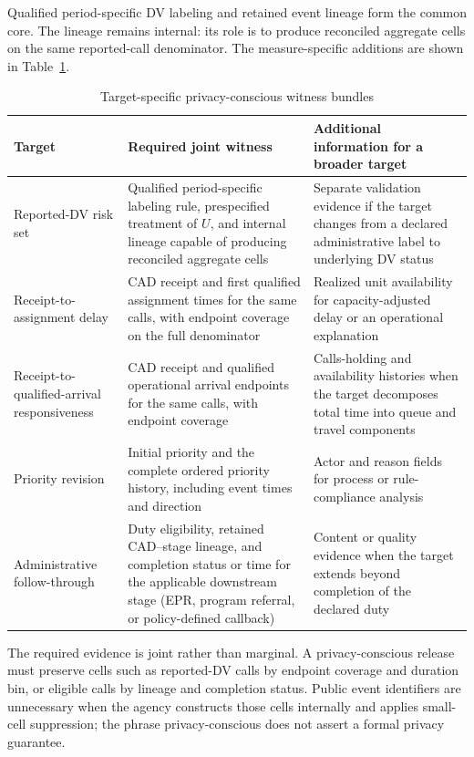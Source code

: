 \documentclass[11pt]{article}
\begin{document}
Qualified period-specific DV labeling and retained event lineage form the common core. The lineage remains internal: its role is to produce reconciled aggregate cells on the same reported-call denominator. The measure-specific additions are shown in Table~\ref{tab:witness_bundles}.

\begin{table}[H]
\centering
\caption{Target-specific privacy-conscious witness bundles}
\label{tab:witness_bundles}
\begin{tabularx}{\textwidth}{@{}>{\raggedright\arraybackslash}p{2.75cm} X X@{}}
\toprule
Target & Required joint witness & Additional information for a broader target \\
\midrule
Reported-DV risk set &
Qualified period-specific labeling rule, prespecified treatment of $U$, and internal lineage capable of producing reconciled aggregate cells &
Separate validation evidence if the target changes from a declared administrative label to underlying DV status \\
\addlinespace
Receipt-to-assignment delay &
CAD receipt and first qualified assignment times for the same calls, with endpoint coverage on the full denominator &
Realized unit availability for capacity-adjusted delay or an operational explanation \\
\addlinespace
Receipt-to-qualified-arrival responsiveness &
CAD receipt and qualified operational arrival endpoints for the same calls, with endpoint coverage &
Calls-holding and availability histories when the target decomposes total time into queue and travel components \\
\addlinespace
Priority revision &
Initial priority and the complete ordered priority history, including event times and direction &
Actor and reason fields for process or rule-compliance analysis \\
\addlinespace
Administrative follow-through &
Duty eligibility, retained CAD--stage lineage, and completion status or time for the applicable downstream stage (EPR, program referral, or policy-defined callback) &
Content or quality evidence when the target extends beyond completion of the declared duty \\
\bottomrule
\end{tabularx}
\end{table}

The required evidence is joint rather than marginal. A privacy-conscious release must preserve cells such as reported-DV calls by endpoint coverage and duration bin, or eligible calls by lineage and completion status. Public event identifiers are unnecessary when the agency constructs those cells internally and applies small-cell suppression; the phrase privacy-conscious does not assert a formal privacy guarantee.
\end{document}

